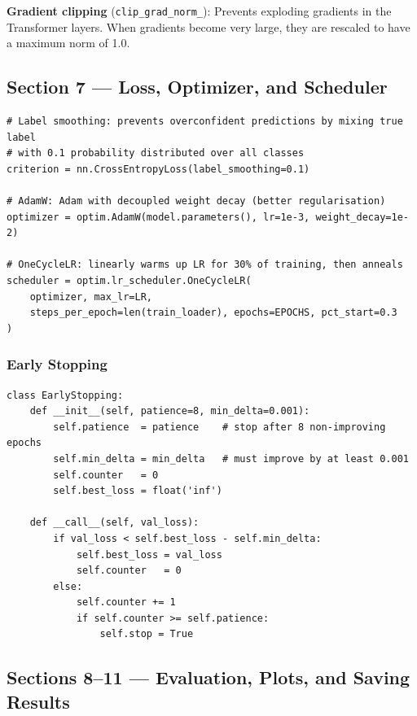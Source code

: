 \documentclass[12pt,a4paper]{article}
\begin{document}
\begin{infobox}
\textbf{Gradient clipping} (\texttt{clip\_grad\_norm\_}): Prevents exploding gradients in the Transformer layers. When gradients become very large, they are rescaled to have a maximum norm of 1.0.
\end{infobox}

\subsection{Section 7 --- Loss, Optimizer, and Scheduler}

\begin{lstlisting}
# Label smoothing: prevents overconfident predictions by mixing true label
# with 0.1 probability distributed over all classes
criterion = nn.CrossEntropyLoss(label_smoothing=0.1)

# AdamW: Adam with decoupled weight decay (better regularisation)
optimizer = optim.AdamW(model.parameters(), lr=1e-3, weight_decay=1e-2)

# OneCycleLR: linearly warms up LR for 30% of training, then anneals
scheduler = optim.lr_scheduler.OneCycleLR(
    optimizer, max_lr=LR,
    steps_per_epoch=len(train_loader), epochs=EPOCHS, pct_start=0.3
)
\end{lstlisting}

\subsubsection{Early Stopping}

\begin{lstlisting}
class EarlyStopping:
    def __init__(self, patience=8, min_delta=0.001):
        self.patience  = patience    # stop after 8 non-improving epochs
        self.min_delta = min_delta   # must improve by at least 0.001
        self.counter   = 0
        self.best_loss = float('inf')

    def __call__(self, val_loss):
        if val_loss < self.best_loss - self.min_delta:
            self.best_loss = val_loss
            self.counter   = 0
        else:
            self.counter += 1
            if self.counter >= self.patience:
                self.stop = True
\end{lstlisting}

\subsection{Sections 8--11 --- Evaluation, Plots, and Saving Results}
\end{document}
